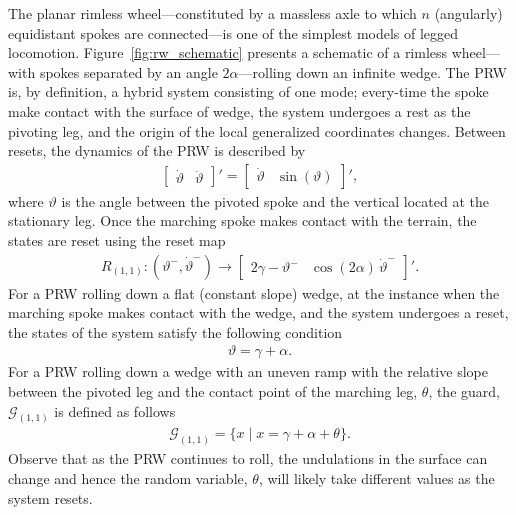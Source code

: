 \begin{example}
\label{example:rw}
  The planar rimless wheel---constituted by a massless axle to which $n$ (angularly) equidistant spokes are connected---is one of the simplest models of legged locomotion. Figure~\ref{fig:rw_schematic} presents a schematic of a rimless wheel---with spokes separated by an angle $2\alpha$---rolling down an infinite wedge. The PRW is, by definition, a hybrid system consisting of one mode; every-time the spoke make contact with the surface of wedge, the system undergoes a rest as the pivoting leg, and the origin of the local generalized coordinates changes. Between resets, the dynamics of the PRW is described by
\begin{align}
  \begin{bmatrix}
    \dot \vartheta& \ddot\vartheta
  \end{bmatrix}'=\begin{bmatrix}
    \dot\vartheta&\sin(\vartheta)
  \end{bmatrix}',
\end{align}
where $\vartheta$ is the angle between the pivoted spoke and the vertical located at the stationary leg. Once the marching spoke makes contact with the terrain, the states are reset using the reset map
\begin{align}
R_{(1,1)}\colon (\vartheta^-,\dot \vartheta^-)\rightarrow\begin{bmatrix}
    2\gamma-\vartheta^-&
    \cos(2\alpha)\,\dot\vartheta^-
  \end{bmatrix}'.
\end{align}
For a PRW rolling down a flat (constant slope) wedge, at the instance when the marching spoke makes contact with the wedge, and the system undergoes a reset, the states of the system satisfy the following condition
\begin{align}
\vartheta = \gamma+\alpha.
\end{align}
For a PRW rolling down a wedge with an uneven ramp with the relative slope between the pivoted leg and the contact point of the marching leg, $\theta$, the guard, $\mathcal G_{(1,1)}$ is defined as follows
\begin{align}
\mathcal G_{(1,1)}=\{x\mid x=\gamma+\alpha+\theta\}.
\end{align}
Observe that as the PRW continues to roll, the undulations in the surface can change and hence the random variable, $\theta$, will likely take different values as the system resets.
\end{example}
